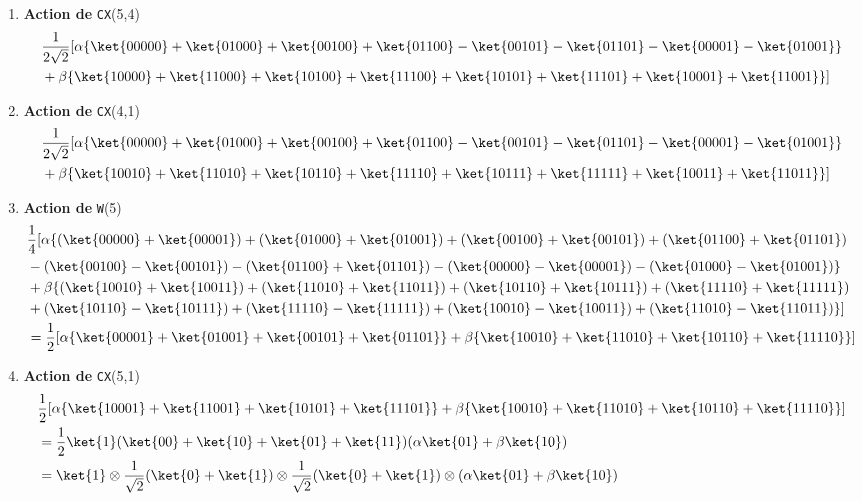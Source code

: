 \begin{enumerate}
\begin{enumerate}
\item\textbf{Action de} \texttt{CX}(5,4)
\begin{equation}
\begin{split}
& \frac{1}{2\sqrt{2}} [\alpha\{\ket{00000} +\ket{01000} +\ket{00100}
+\ket{01100} -\ket{ 00101} -\ket{01101} -\ket{ 00001} -\ket{01001}\} \\
& +\beta\{\ket{10000} +\ket{11000} +\ket{10100} +\ket{11100} +\ket{ 10101}
+\ket{11101} +\ket{ 10001} +\ket{11001}\} ]
\end{split}
\end{equation}

\item\textbf{Action de} \texttt{CX}(4,1)
\begin{equation}
\begin{split}
& \frac{1}{2\sqrt{2}}[\alpha\{ \ket{00000} +\ket{01000} +\ket{ 00100}
+\ket{01100} -\ket{ 00101} -\ket{01101} -\ket{ 00001} -\ket{01001}\} \\
& +\beta\{\ket{10010} +\ket{11010} +\ket{10110} +\ket{11110} +\ket{ 10111}
+\ket{11111} +\ket{ 10011} +\ket{11011}\} ]
\end{split}
\end{equation}

\item\textbf{Action de} \texttt{W}(5)
\begin{equation}
\begin{split}
& \frac{1}{4}[\alpha\{(\ket{ 00000} +\ket{00001})+(\ket{01000}
+\ket{01001})+(\ket{ 00100} +\ket{00101})+(\ket{ 01100} +\ket{01101}) \\
& -(\ket{00100} -\ket{00101}) -(\ket{01100} +\ket{01101})
-(\ket{00000} -\ket{00001}) -(\ket{01000} -\ket{01001}) \}\\
& +\beta\{(\ket{10010} +\ket{ 10011})+(\ket{11010} +\ket{ 11011})+(\ket{10110}
+\ket{ 10111})+(\ket{11110} +\ket{ 11111}) \\
& +(\ket{10110} -\ket{10111}) +(\ket{11110} -\ket{11111})
+(\ket{10010} -\ket{10011}) +(\ket{11010} -\ket{11011}) \}]\\
& =\frac{1}{2}[\alpha\{\ket{00001} +\ket{01001} +\ket{00101} +\ket{01101}\}
+\beta\{\ket{10010} +\ket{11010} +\ket{10110} +\ket{11110}\} ]
\end{split}
\end{equation}

\item\textbf{Action de} \texttt{CX}(5,1)
\begin{equation}
\begin{split}
& \frac{1}{2}[\alpha\{ \ket{10001} +\ket{11001} +\ket{ 10101} +\ket{11101}\}
  +\beta\{ \ket{10010} +\ket{11010} +\ket{ 10110} +\ket{11110}\}] \\
& =\frac{1}{2}\ket{1} (\ket{00} +\ket{10} +\ket{01}+\ket{11})(\alpha\ket{01}
+\beta\ket{10}) \\
& =\ket{1} \otimes\frac{1}{\sqrt{2}}(\ket{ 0} +\ket{1})\otimes\frac{1}
{\sqrt{2}}(\ket{0} +\ket{1}) \otimes(\alpha\ket{01}+\beta\ket{ 10})
\end{split}
\end{equation}
\end{enumerate}


\end{enumerate}
